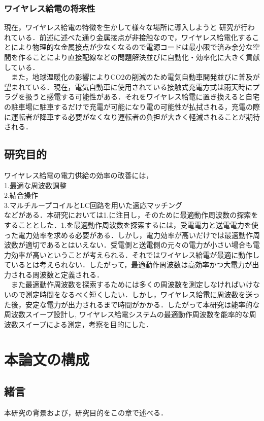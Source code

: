 \documentclass[12pt]{jarticle}
\begin{document}
\subsubsection{ワイヤレス給電の将来性}
現在，ワイヤレス給電の特徴を生かして様々な場所に導入しようと 研究が行われている．前述に述べた通り金属接点が非接触なので，ワイヤレス給電化することにより物理的な金属接点が少なくなるので電源コードは最小限で済み余分な空間を作ることにより直接配線などの問題解決並びに自動化・効率化に大きく貢献している\cite{syourai}\cite{matuda}．
\\　また，地球温暖化の影響によりCO{\tiny 2}の削減のため電気自動車開発並びに普及が望まれている．現在，電気自動車に使用されている接触式充電方式は雨天時にプラグを扱うと感電する可能性がある．それをワイヤレス給電に置き換えると自宅の駐車場に駐車するだけで充電が可能になり電の可能性が払拭される，充電の際に運転者が降車する必要がなくなり運転者の負担が大きく軽減されることが期待される．\cite{hakugin}
\clearpage
\subsection{研究目的}
ワイヤレス給電の電力供給の効率の改善には，
\\1.最適な周波数調整
\\2.結合操作
\\3.マルチループコイルとLC回路を用いた適応マッチング
\\などがある\cite{morita}．本研究においては1.に注目し，そのために最適動作周波数の探索をすることとした．1.を最適動作周波数を探索するには，受電電力と送電電力を使った電力効率を求める必要がある．しかし，電力効率が高いだけでは最適動作周波数が適切であるとはいえない．受電側と送電側の元々の電力が小さい場合も電力効率が高いということが考えられる．それではワイヤレス給電が最適に動作しているとは考えられない．したがって，最適動作周波数は高効率かつ大電力が出力される周波数と定義される．
\\　また最適動作周波数を探索するためには多くの周波数を測定しなければいけないので測定時間をなるべく短くしたい．しかし，ワイヤレス給電に周波数を送った後，安定な電力が出力されるまで時間がかかる．したがって本研究は能率的な周波数スイープ設計し,
ワイヤレス給電システムの最適動作周波数を能率的な周波数スイープによる測定，考察を目的にした．
\clearpage
\section{本論文の構成}
\subsection*{緒言}
	本研究の背景および，研究目的をこの章で述べる．
\end{document}
